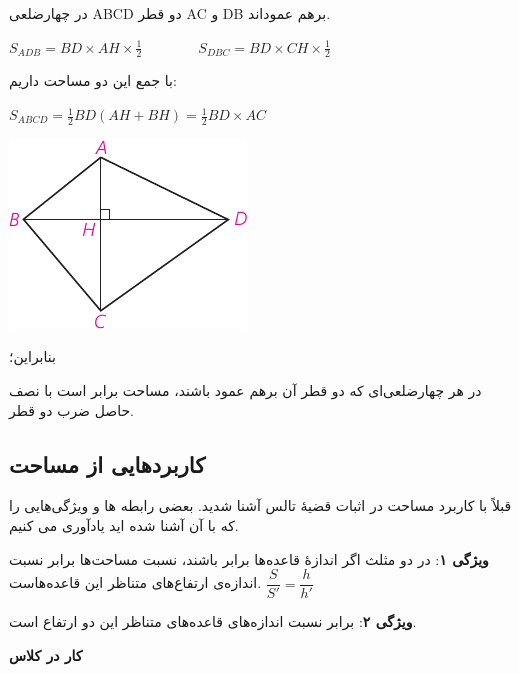 \documentclass[12pt, a4paper, twoside]{book}
\begin{document}
\begin{minipage}{0.65\textwidth}
	در چهارضلعی ABCD دو قطر AC و DB برهم عموداند.
	\begin{flushleft}
		$ S_{ADB} = BD \times AH \times \frac12 \qquad \qquad S_{DBC} = BD \times CH \times \frac12 $
	\end{flushleft}
	با جمع این دو مساحت داریم:
	\begin{flushleft}
		$S_{ABCD} = \frac12 BD (AH + BH) = \frac12 BD \times AC$
	\end{flushleft}
\end{minipage}
\begin{minipage}{0.3\textwidth}
	\begin{flushleft}
		\includegraphics{"Shapes/Fasl - 3/Dars 2/P65-S4"}
	\end{flushleft}
\end{minipage}

بنابراین؛

در هر چهارضلعی‌ای که دو قطر آن برهم عمود باشند، مساحت برابر است با نصف حاصل ضرب دو قطر.

\subsection{کاربردهایی از مساحت}
قبلاً با کاربرد مساحت در اثبات قضیهٔ تالس آشنا شدید. بعضی رابطه ها و ویژگی‌هایی را که با آن آشنا شده اید یادآوری می کنیم.
\bigskip

\textbf{ویژگی ۱}:
در دو مثلث اگر اندازۀ قاعده‌ها برابر باشند، نسبت مساحت‌ها برابر نسبت اندازه‌ی ارتفاع‌های متناظر این قاعده‌هاست.
$
	\dfrac{S}{S'} = \dfrac{h}{h'}
$
 \bigskip

\textbf{ویژگی ۲}:
 برابر نسبت اندازه‌های قاعده‌های متناظر این دو ارتفاع است.
 \bigskip
 
 \textbf{کار در کلاس}
 
\end{document}
